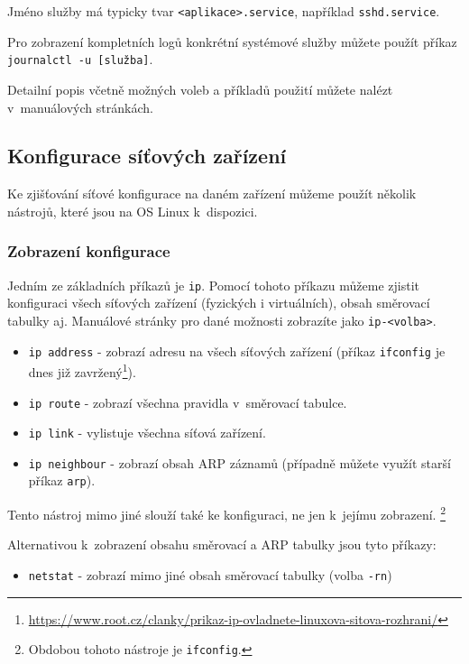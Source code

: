Jméno služby má typicky tvar \texttt{<aplikace>.service}, například
\texttt{sshd.service}.

Pro zobrazení kompletních logů konkrétní systémové služby můžete použít příkaz
\texttt{journalctl -u [služba]}.

Detailní popis včetně možných voleb a příkladů použití můžete nalézt
v~manuálových stránkách.



\subsection{Konfigurace síťových zařízení}
\label{basic_ipconfig}
Ke zjišťování síťové konfigurace na daném zařízení můžeme použít několik nástrojů,
které jsou na OS Linux k~dispozici.

\subsubsection{Zobrazení konfigurace}
Jedním ze základních příkazů je \texttt{ip}. Pomocí tohoto příkazu můžeme zjistit
konfiguraci všech síťových zařízení (fyzických i virtuálních), obsah směrovací tabulky aj. Manuálové stránky pro dané možnosti zobrazíte jako \texttt{ip-<volba>}.

\begin{itemize}
  \item \texttt{ip address} - zobrazí adresu na všech síťových zařízení (příkaz
    \texttt{ifconfig} je dnes již zavržený\footnote{\url{https://www.root.cz/clanky/prikaz-ip-ovladnete-linuxova-sitova-rozhrani/}}).
				\item \texttt{ip route} - zobrazí všechna pravidla v~směrovací tabulce.
				\item \texttt{ip link} - vylistuje všechna síťová zařízení.
        \item \texttt{ip neighbour} - zobrazí obsah ARP záznamů (případně můžete
          využít starší příkaz \texttt{arp}).
\end{itemize}

Tento nástroj mimo jiné slouží také ke konfiguraci, ne jen k~jejímu zobrazení. \footnote{Obdobou tohoto nástroje je \texttt{ifconfig}.}


Alternativou k~zobrazení obsahu směrovací a ARP tabulky jsou tyto příkazy:
\begin{itemize}
\item \texttt{netstat} - zobrazí mimo jiné obsah směrovací tabulky (volba \texttt{-rn})
\end{itemize}


